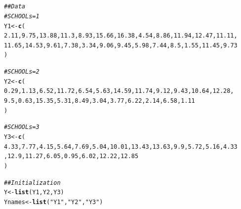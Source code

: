 \documentclass{article}\usepackage[]{graphicx}\usepackage[]{xcolor}
\makeatletter
\newcommand{\hlnum}[1]{\textcolor[rgb]{0.686,0.059,0.569}{#1}}%
\newcommand{\hlsng}[1]{\textcolor[rgb]{0.192,0.494,0.8}{#1}}%
\newcommand{\hlcom}[1]{\textcolor[rgb]{0.678,0.584,0.686}{\textit{#1}}}%
\newcommand{\hldef}[1]{\textcolor[rgb]{0.345,0.345,0.345}{#1}}%
\newcommand{\hlkwb}[1]{\textcolor[rgb]{0.69,0.353,0.396}{#1}}%
\newcommand{\hlkwd}[1]{\textcolor[rgb]{0.737,0.353,0.396}{\textbf{#1}}}%
\newenvironment{kframe}{%
 \def\at@end@of@kframe{}%
 \ifinner\ifhmode%
  \def\at@end@of@kframe{\end{minipage}}%
  \begin{minipage}{\columnwidth}%
 \fi\fi%
 \def\FrameCommand##1{\hskip\@totalleftmargin \hskip-\fboxsep
 \colorbox{shadecolor}{##1}\hskip-\fboxsep
     \hskip-\linewidth \hskip-\@totalleftmargin \hskip\columnwidth}%
 \MakeFramed {\advance\hsize-\width
   \@totalleftmargin\z@ \linewidth\hsize
   \@setminipage}}%
 {\par\unskip\endMakeFramed%
 \at@end@of@kframe}
\newenvironment{knitrout}{}{} %
\makeatother
\begin{document}
\section{}
\begin{knitrout}
\color{fgcolor}\begin{kframe}
\begin{alltt}
\hlcom{## Data}
\hlcom{# SCHOOL s=1}
\hldef{Y1} \hlkwb{<-} \hlkwd{c}\hldef{(}
  \hlnum{2.11}\hldef{,} \hlnum{9.75}\hldef{,} \hlnum{13.88}\hldef{,} \hlnum{11.3}\hldef{,} \hlnum{8.93}\hldef{,} \hlnum{15.66}\hldef{,} \hlnum{16.38}\hldef{,} \hlnum{4.54}\hldef{,} \hlnum{8.86}\hldef{,} \hlnum{11.94}\hldef{,} \hlnum{12.47}\hldef{,} \hlnum{11.11}\hldef{,}
  \hlnum{11.65}\hldef{,} \hlnum{14.53}\hldef{,} \hlnum{9.61}\hldef{,} \hlnum{7.38}\hldef{,} \hlnum{3.34}\hldef{,} \hlnum{9.06}\hldef{,} \hlnum{9.45}\hldef{,} \hlnum{5.98}\hldef{,} \hlnum{7.44}\hldef{,} \hlnum{8.5}\hldef{,} \hlnum{1.55}\hldef{,} \hlnum{11.45}\hldef{,} \hlnum{9.73}
\hldef{)}

\hlcom{# SCHOOL s=2}
\hldef{Y2} \hlkwb{<-} \hlkwd{c}\hldef{(}
  \hlnum{0.29}\hldef{,} \hlnum{1.13}\hldef{,} \hlnum{6.52}\hldef{,} \hlnum{11.72}\hldef{,} \hlnum{6.54}\hldef{,} \hlnum{5.63}\hldef{,} \hlnum{14.59}\hldef{,} \hlnum{11.74}\hldef{,} \hlnum{9.12}\hldef{,} \hlnum{9.43}\hldef{,} \hlnum{10.64}\hldef{,} \hlnum{12.28}\hldef{,}
  \hlnum{9.5}\hldef{,} \hlnum{0.63}\hldef{,} \hlnum{15.35}\hldef{,} \hlnum{5.31}\hldef{,} \hlnum{8.49}\hldef{,} \hlnum{3.04}\hldef{,} \hlnum{3.77}\hldef{,} \hlnum{6.22}\hldef{,} \hlnum{2.14}\hldef{,} \hlnum{6.58}\hldef{,} \hlnum{1.11}
\hldef{)}

\hlcom{# SCHOOL s=3}
\hldef{Y3} \hlkwb{<-} \hlkwd{c}\hldef{(}
  \hlnum{4.33}\hldef{,} \hlnum{7.77}\hldef{,} \hlnum{4.15}\hldef{,} \hlnum{5.64}\hldef{,} \hlnum{7.69}\hldef{,} \hlnum{5.04}\hldef{,} \hlnum{10.01}\hldef{,} \hlnum{13.43}\hldef{,} \hlnum{13.63}\hldef{,} \hlnum{9.9}\hldef{,} \hlnum{5.72}\hldef{,} \hlnum{5.16}\hldef{,} \hlnum{4.33}
  \hldef{,} \hlnum{12.9}\hldef{,} \hlnum{11.27}\hldef{,} \hlnum{6.05}\hldef{,} \hlnum{0.95}\hldef{,} \hlnum{6.02}\hldef{,} \hlnum{12.22}\hldef{,} \hlnum{12.85}
\hldef{)}

\hlcom{## Initialization}
\hldef{Y} \hlkwb{<-} \hlkwd{list}\hldef{(Y1, Y2, Y3)}
\hldef{Ynames} \hlkwb{<-} \hlkwd{list}\hldef{(}\hlsng{"Y1"}\hldef{,} \hlsng{"Y2"}\hldef{,} \hlsng{"Y3"}\hldef{)}


\end{alltt}
\end{kframe}
\end{knitrout}
\end{document}

